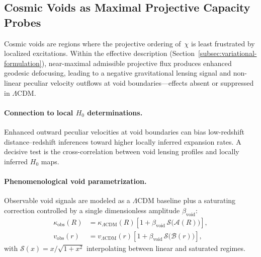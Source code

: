 \subsection{Cosmic Voids as Maximal Projective Capacity Probes}
  \label{subsec:cosmic-voids}

  Cosmic voids are regions where the projective ordering of~$\chi$ is least
  frustrated by localized excitations.
  Within the effective description
  (Section~\ref{subsec:variational-formulation}), near-maximal admissible
  projective flux produces enhanced geodesic defocusing, leading to a
  negative gravitational lensing signal and non-linear peculiar velocity
  outflows at void boundaries---effects absent or suppressed in
  $\Lambda$CDM.

  \paragraph{Connection to local $H_0$ determinations.}
    Enhanced outward peculiar velocities at void boundaries can bias
    low-redshift distance--redshift inferences toward higher locally inferred
    expansion rates.
    A decisive test is the cross-correlation between void lensing profiles
    and locally inferred $H_0$ maps.

  \paragraph{Phenomenological void parametrization.}
    Observable void signals are modeled as a $\Lambda$CDM baseline plus a
    saturating correction controlled by a single dimensionless amplitude
    $\beta_{\textrm{void}}$:
    \begin{align}
      \kappa_{\textrm{obs}}(R) &=
      \kappa_{\Lambda{\textrm{CDM}}}(R)
      \left[1+\beta_{\textrm{void}}\,
        \mathcal{S}\!\big(\mathcal{A}(R)\big)\right],\\
      v_{\textrm{obs}}(r) &=
      v_{\Lambda{\textrm{CDM}}}(r)
      \left[1+\beta_{\textrm{void}}\,
        \mathcal{S}\!\big(\mathcal{B}(r)\big)\right],
    \end{align}
    with $\mathcal{S}(x)=x/\sqrt{1+x^2}$ interpolating between linear and
    saturated regimes.
